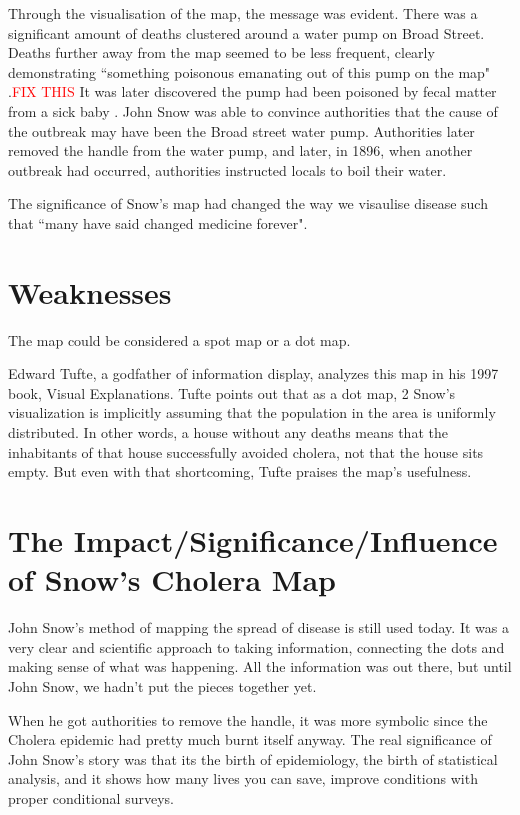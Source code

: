 \documentclass[12pt]{article}
\newcommand\todo[1]{\textcolor{red}{#1}}
\begin{document}
Through the visualisation of the map, the message was evident. There was a significant amount of deaths clustered around a water pump on Broad Street. Deaths further away from the map seemed to be less frequent, clearly demonstrating ``something poisonous emanating out of this pump on the map" \cite{blog}.\todo{FIX THIS} It was later discovered the pump had been poisoned by fecal matter from a sick baby \cite{heros}. John Snow was able to convince authorities that the cause of the outbreak may have been the Broad street water pump. Authorities later removed the handle from the water pump, and later, in 1896, when another outbreak had occurred, authorities instructed locals to boil their water. 

The significance of Snow's map had changed the way we visaulise disease such that ``many have said changed medicine forever". \cite{heros}

\section{Weaknesses}
The map could be considered a spot map or a dot map. 

Edward Tufte, a godfather of information display, analyzes this map in his 1997 book, Visual Explanations. Tufte points out that as a dot map, 2 Snow’s visualization is implicitly assuming that the population in the area is uniformly distributed. In other words, a house without any deaths means that the inhabitants of that house successfully avoided cholera, not that the house sits empty. But even with that shortcoming, Tufte praises the map’s usefulness. \cite{blog}

\section{The Impact/Significance/Influence of Snow's Cholera Map}

John Snow's method of mapping the spread of disease is still used today. It was a very clear and scientific approach to taking information, connecting the dots and making sense of what was happening. All the information was out there, but until John Snow, we hadn't put the pieces together yet. \cite{channel1}

When he got authorities to remove the handle, it was more symbolic since the Cholera epidemic had pretty much burnt itself anyway. The real significance of John Snow's story was that its the birth of epidemiology, the birth of statistical analysis, and it shows how many lives you can save, improve conditions with proper conditional surveys. \cite{youtube}
\end{document}
